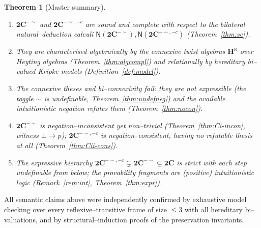 \documentclass{amsart}
\theoremstyle{plain}
\newtheorem{theorem}{Theorem}
\theoremstyle{definition}
\newcommand{\To}{\rightarrow}
\newcommand{\bigC}{\mathbf{2C}}
\newcommand{\Ci}{\mathbf{2C}^{-{\sim}}}        %
\newcommand{\Cii}{\mathbf{2C}^{-{\sim},-c}}    %
\begin{document}
\begin{theorem}[Master summary]\label{thm:master}
\leavevmode
\begin{enumerate}
\item[(a)] $\Ci$ and $\Cii$ are sound and complete with respect to the bilateral
natural--deduction calculi $\mathsf{N}(\Ci),\mathsf{N}(\Cii)$
(Theorem~\ref{thm:sc}).
\item[(b)] They are characterised algebraically by the connexive twist algebras
$\mathbf H^{\bowtie}$ over Heyting algebras (Theorem~\ref{thm:algcompl}) and
relationally by hereditary bi--valued Kripke models (Definition~\ref{def:model}).
\item[(c)] The connexive theses and bi--connexivity \emph{fail}: they are not
expressible (the toggle ${\sim}$ is undefinable, Theorem~\ref{thm:undefneg}) and
the available intuitionistic negation refutes them
(Theorem~\ref{thm:nocon}).
\item[(d)] $\Ci$ is negation--inconsistent yet non--trivial
(Theorem~\ref{thm:Ci-incon}, witness $\bot\To p$); $\Cii$ is
negation--consistent, having no refutable thesis at all
(Theorem~\ref{thm:Cii-cons}).
\item[(e)] The expressive hierarchy $\Cii\subsetneq\Ci\subsetneq\bigC$ is strict
with each step undefinable from below; the provability fragments are
(positive) intuitionistic logic (Remark~\ref{rem:int}, Theorem~\ref{thm:expr}).
\end{enumerate}
\end{theorem}

All semantic claims above were independently confirmed by exhaustive
model checking over every reflexive--transitive frame of size $\le 3$ with all
hereditary bi--valuations, and by structural--induction proofs of the
preservation invariants.
\end{document}
